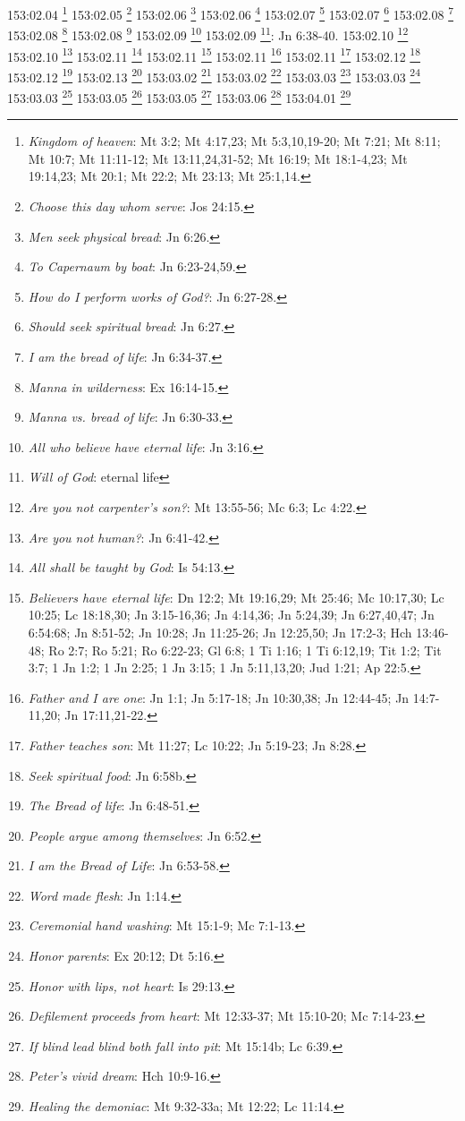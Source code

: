 {{153:02.04 \footnote{\textit{Kingdom of heaven}: Mt 3:2; Mt 4:17,23; Mt 5:3,10,19-20; Mt 7:21; Mt 8:11; Mt 10:7; Mt 11:11-12; Mt 13:11,24,31-52; Mt 16:19; Mt 18:1-4,23; Mt 19:14,23; Mt 20:1; Mt 22:2; Mt 23:13; Mt 25:1,14.}
153:02.05 \footnote{\textit{Choose this day whom serve}: Jos 24:15.}
153:02.06 \footnote{\textit{Men seek physical bread}: Jn 6:26.}
153:02.06 \footnote{\textit{To Capernaum by boat}: Jn 6:23-24,59.}
153:02.07 \footnote{\textit{How do I perform works of God?}: Jn 6:27-28.}
153:02.07 \footnote{\textit{Should seek spiritual bread}: Jn 6:27.}
153:02.08 \footnote{\textit{I am the bread of life}: Jn 6:34-37.}
153:02.08 \footnote{\textit{Manna in wilderness}: Ex 16:14-15.}
153:02.08 \footnote{\textit{Manna vs. bread of life}: Jn 6:30-33.}
153:02.09 \footnote{\textit{All who believe have eternal life}: Jn 3:16.}
153:02.09 \footnote{\textit{Will of God}: eternal life}: Jn 6:38-40.}
153:02.10 \footnote{\textit{Are you not carpenter's son?}: Mt 13:55-56; Mc 6:3; Lc 4:22.}
153:02.10 \footnote{\textit{Are you not human?}: Jn 6:41-42.}
153:02.11 \footnote{\textit{All shall be taught by God}: Is 54:13.}
153:02.11 \footnote{\textit{Believers have eternal life}: Dn 12:2; Mt 19:16,29; Mt 25:46; Mc 10:17,30; Lc 10:25; Lc 18:18,30; Jn 3:15-16,36; Jn 4:14,36; Jn 5:24,39; Jn 6:27,40,47; Jn 6:54:68; Jn 8:51-52; Jn 10:28; Jn 11:25-26; Jn 12:25,50; Jn 17:2-3; Hch 13:46-48; Ro 2:7; Ro 5:21; Ro 6:22-23; Gl 6:8; 1 Ti 1:16; 1 Ti 6:12,19; Tit 1:2; Tit 3:7; 1 Jn 1:2; 1 Jn 2:25; 1 Jn 3:15; 1 Jn 5:11,13,20; Jud 1:21; Ap 22:5.}
153:02.11 \footnote{\textit{Father and I are one}: Jn 1:1; Jn 5:17-18; Jn 10:30,38; Jn 12:44-45; Jn 14:7-11,20; Jn 17:11,21-22.}
153:02.11 \footnote{\textit{Father teaches son}: Mt 11:27; Lc 10:22; Jn 5:19-23; Jn 8:28.}
153:02.12 \footnote{\textit{Seek spiritual food}: Jn 6:58b.}
153:02.12 \footnote{\textit{The Bread of life}: Jn 6:48-51.}
153:02.13 \footnote{\textit{People argue among themselves}: Jn 6:52.}
153:03.02 \footnote{\textit{I am the Bread of Life}: Jn 6:53-58.}
153:03.02 \footnote{\textit{Word made flesh}: Jn 1:14.}
153:03.03 \footnote{\textit{Ceremonial hand washing}: Mt 15:1-9; Mc 7:1-13.}
153:03.03 \footnote{\textit{Honor parents}: Ex 20:12; Dt 5:16.}
153:03.03 \footnote{\textit{Honor with lips, not heart}: Is 29:13.}
153:03.05 \footnote{\textit{Defilement proceeds from heart}: Mt 12:33-37; Mt 15:10-20; Mc 7:14-23.}
153:03.05 \footnote{\textit{If blind lead blind both fall into pit}: Mt 15:14b; Lc 6:39.}
153:03.06 \footnote{\textit{Peter's vivid dream}: Hch 10:9-16.}
153:04.01 \footnote{\textit{Healing the demoniac}: Mt 9:32-33a; Mt 12:22; Lc 11:14.}
}
